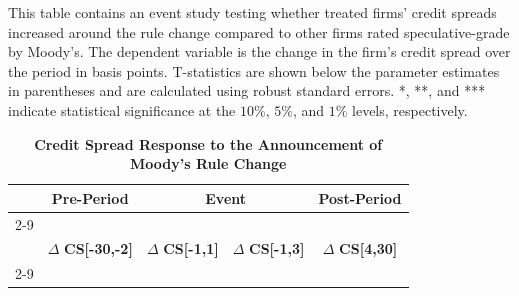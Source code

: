 \documentclass[a4paper, 12pt]{article}
\begin{document}
\begin{landscape}
\pagestyle{empty}
\begin{table}[htbp]
\caption{\textbf{Credit Spread Response to the Announcement of Moody's Rule Change}
} \label{table_spreadun}
\begin{singlespace}
\begin{small}

\noindent This table contains an event study testing whether treated firms' credit spreads increased around the rule change compared to other firms rated speculative-grade by Moody's. The dependent variable is the change in the firm's credit spread over the period in basis points. T-statistics are shown below the parameter estimates in parentheses and are calculated using robust standard errors. *, **, and *** indicate statistical significance at the $10\%$, $5\%$, and $1\%$ levels, respectively.

\end{small}
\end{singlespace}
\vspace{3mm}
\small
  \centering

\begin{tabular}{lcccccccc}
\\
    \toprule
        &
        \multicolumn{2}{c}{\textbf{Pre-Period}} &
      \multicolumn{4}{c}{\textbf{Event}} &
        \multicolumn{2}{c}{\textbf{Post-Period}}
        \\
                  \cline{2-9}
        \\
    &
    \multicolumn{2}{c}{$\Delta$ \textbf{CS[-30,-2]}} &
      \multicolumn{2}{c}{$\Delta$ \textbf{CS[-1,1]}} &
        \multicolumn{2}{c}{$\Delta$ \textbf{CS[-1,3]}} &
           \multicolumn{2}{c}{$\Delta$ \textbf{CS[4,30]}}
      \\
          \cline{2-9}

    \bottomrule
    \end{tabular}
\end{table}
\end{landscape}
\clearpage
\newpage
\end{document}
